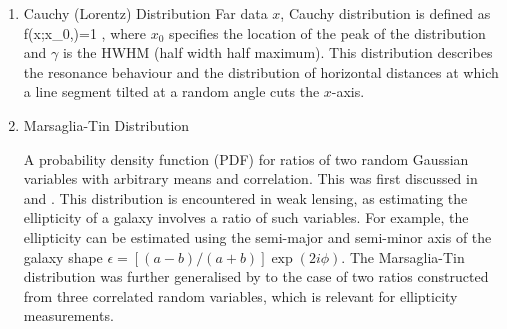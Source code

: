 {\begin{enumerate}
For $x$ being an $N\times p$ matrix, with each row being independently drawn from a $p$-variate normal distribution with mean $\mu=0$, 
the $p\times p$ random scatter matrix $\mathbf{S}=X^TX$ (note that this is the inverse of $\mathbf{S}$ in Wishart distribution) has a inverse Wishart distribution with $N$ degrees of freedom and covariance $\mathbf{C}$
\be
{}^{-1}_p\left(,N\right) = 
\left|  \right|^{N/2}
\exp {}\; ,
\label{eq:Wishart_dist}
\ee
where $\Gamma_p$ is the multivariate Gamma function. 
In cosmology, they are useful as normally parameters precision matrices (inverse of covariance matrices) have inverse Wishart distributions. 
The Inverse-Wishart distribution is the multivariate extension of the inverse-gamma distribution --- in case of integer degrees of 
freedom, it is a multivariate generalisation of the inverse $\chi^2-$distribution; i.e. for a single data point ($p=1$), the 
inverse Wishart distribution is the inverse $\chi^2$ distribution. For examples of the use of this distribution in
weak lensing see \cite{2013MNRAS.432.1928T,2014IAUS..306...99J}
\\
\item Cauchy (Lorentz) Distribution
Far data $x$, Cauchy distribution is defined as 
\be
f(x;x_{0},\gamma )={1 \over \pi \gamma }\;,
\ee
where $x_0$ specifies the location of the peak of the distribution and $\gamma$ is the HWHM (half width half maximum). 
This distribution describes the resonance behaviour and the distribution of horizontal distances at which a line segment 
tilted at a random angle cuts the $x$-axis.
\\
\item Marsaglia-Tin Distribution

A probability density function (PDF) for ratios of two random Gaussian variables with arbitrary means and correlation. 
This was first discussed in \cite{Marsaglia:1965:RNV} and \cite{10.2307/2283154}. This distribution is encountered 
in weak lensing, as estimating the ellipticity of a galaxy involves a ratio of  
such variables. For example, the ellipticity can be estimated using the semi-major and semi-minor axis of the galaxy shape 
$\epsilon = [(a-b)/(a + b)] \exp(2i\phi)$. The Marsaglia-Tin distribution was further generalised 
by \cite{Viola01042014} to the case of two ratios constructed from three correlated random variables, which is relevant 
for ellipticity measurements.
\end{enumerate}}%

